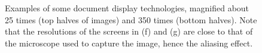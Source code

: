 \begin{figure}
\begin{centering}
         \hspace{1mm} 
         \hspace{1mm} 

    \end{centering}

    \caption[Examples of document display technologies]{Examples of some document display technologies, magnified about 25 times (top halves of images) and 350 times (bottom halves). Note that the resolutions of the screens in (f) and (g) are close to that of the microscope used to capture the image, hence the aliasing effect.}
    \label{fig:screens}
\end{figure}





